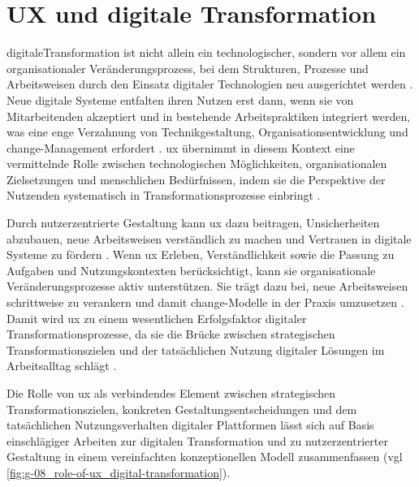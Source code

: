 \section{UX und digitale Transformation}
\label{sec:02-04_ux-in-digital-transformation}

\Gls{digitaleTransformation} ist nicht allein ein technologischer, sondern vor allem ein organisationaler Veränderungsprozess, bei dem Strukturen, Prozesse und Arbeitsweisen durch den Einsatz digitaler Technologien neu ausgerichtet werden \cite{403:Westerman2014}. Neue digitale Systeme entfalten ihren Nutzen erst dann, wenn sie von Mitarbeitenden akzeptiert und in bestehende Arbeitspraktiken integriert werden, was eine enge Verzahnung von Technikgestaltung, Organisationsentwicklung und \Gls{change}-Management erfordert \cite{403:Westerman2014,300:FraunhoferIESE2018}. \Gls{ux} übernimmt in diesem Kontext eine vermittelnde Rolle zwischen technologischen Möglichkeiten, organisationalen Zielsetzungen und menschlichen Bedürfnissen, indem sie die Perspektive der Nutzenden systematisch in Transformationsprozesse einbringt \cite{408:Hassenzahl2010,417:Benyon2019}.

Durch nutzerzentrierte Gestaltung kann \Gls{ux} dazu beitragen, Unsicherheiten abzubauen, neue Arbeitsweisen verständlich zu machen und Vertrauen in digitale Systeme zu fördern \cite{417:Benyon2019,109:Liedtka2018}. Wenn \Gls{ux} Erleben, Verständlichkeit sowie die Passung zu Aufgaben und Nutzungskontexten berücksichtigt, kann sie organisationale Veränderungsprozesse aktiv unterstützen. Sie trägt dazu bei, neue Arbeitsweisen schrittweise zu verankern und damit \Gls{change}-Modelle in der Praxis umzusetzen \cite{403:Westerman2014,418:Kotter2012}. Damit wird \Gls{ux} zu einem wesentlichen Erfolgsfaktor digitaler Transformationsprozesse, da sie die Brücke zwischen strategischen Transformationszielen und der tatsächlichen Nutzung digitaler Lösungen im Arbeitsalltag schlägt \cite{417:Benyon2019,110:Lewin1947}.

Die Rolle von \Gls{ux} als verbindendes Element zwischen strategischen Transformationszielen, konkreten Gestaltungsentscheidungen und dem tatsächlichen Nutzungsverhalten digitaler Plattformen lässt sich auf Basis einschlägiger Arbeiten zur digitalen Transformation und zu nutzerzentrierter Gestaltung in einem vereinfachten konzeptionellen Modell zusammenfassen \cite{100:WhartonUX2015,301:Infragistics2015,403:Westerman2014} (\acrshort{vgl} \autoref{fig:g-08_role-of-ux_digital-transformation}).




